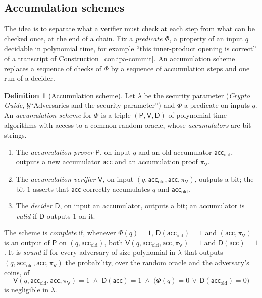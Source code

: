 \documentclass[11pt,a4paper]{article}
\theoremstyle{definition}
\newtheorem{definition}[theorem]{Definition}
\begin{document}
\subsection{Accumulation schemes}
\label{sec:pcd-acc}

The idea is to separate what a verifier must check at each step from
what can be checked once, at the end of a chain. Fix a
\emph{predicate} $\Phi$, a property of an input $q$ decidable in
polynomial time, for example ``this inner-product opening is correct''
of a transcript of Construction~\ref{con:ipa-commit}. An accumulation
scheme replaces a sequence of checks of $\Phi$ by a sequence of
accumulation steps and one run of a decider.

\begin{definition}[Accumulation scheme]\label{def:pcd-acc}
Let $\lambda$ be the security parameter (\emph{Crypto Guide},
\S``Adversaries and the security parameter'') and $\Phi$ a predicate on
inputs $q$. An \emph{accumulation scheme} for $\Phi$ is a triple
$(\mathsf P, \mathsf V, \mathsf D)$ of polynomial-time algorithms with
access to a common random oracle, whose \emph{accumulators} are bit
strings.
\begin{enumerate}[leftmargin=*, itemsep=2pt]
\item The \emph{accumulation prover} $\mathsf P$, on input $q$ and an
  old accumulator $\mathsf{acc}_{\mathrm{old}}$, outputs a new
  accumulator $\mathsf{acc}$ and an accumulation proof $\pi_{\mathsf V}$.
\item The \emph{accumulation verifier} $\mathsf V$, on input
  $(q, \mathsf{acc}_{\mathrm{old}}, \mathsf{acc}, \pi_{\mathsf V})$,
  outputs a bit; the bit $1$ asserts that $\mathsf{acc}$ correctly
  accumulates $q$ and $\mathsf{acc}_{\mathrm{old}}$.
\item The \emph{decider} $\mathsf D$, on input an accumulator, outputs
  a bit; an accumulator is \emph{valid} if $\mathsf D$ outputs $1$ on it.
\end{enumerate}
The scheme is \emph{complete} if, whenever $\Phi(q) = 1$,
$\mathsf D(\mathsf{acc}_{\mathrm{old}}) = 1$ and
$(\mathsf{acc}, \pi_{\mathsf V})$ is an output of $\mathsf P$ on
$(q, \mathsf{acc}_{\mathrm{old}})$, both
$\mathsf V(q, \mathsf{acc}_{\mathrm{old}}, \mathsf{acc}, \pi_{\mathsf V})
= 1$ and $\mathsf D(\mathsf{acc}) = 1$. It is \emph{sound} if for every
adversary of size polynomial in $\lambda$ that outputs
$(q, \mathsf{acc}_{\mathrm{old}}, \mathsf{acc}, \pi_{\mathsf V})$ the
probability, over the random oracle and the adversary's coins, of
\[
\mathsf V(q, \mathsf{acc}_{\mathrm{old}}, \mathsf{acc}, \pi_{\mathsf V})
= 1 \;\wedge\; \mathsf D(\mathsf{acc}) = 1 \;\wedge\;
\bigl(\Phi(q) = 0 \,\vee\, \mathsf D(\mathsf{acc}_{\mathrm{old}}) = 0\bigr)
\]
is negligible in $\lambda$.
\end{definition}
\end{document}
